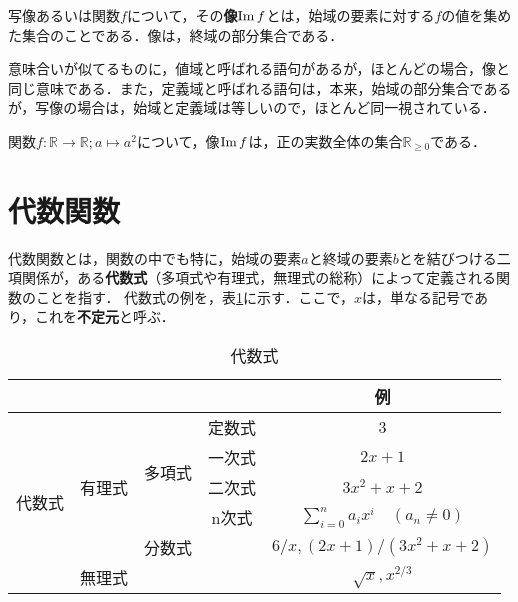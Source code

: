 \begin{definition}[像]
	写像あるいは関数$f$について，その\textbf{像}$\operatorname{Im} f$とは，始域の要素に対する$f$の値を集めた集合のことである．像は，終域の部分集合である．
\end{definition}
\begin{rem*}
	意味合いが似てるものに，値域と呼ばれる語句があるが，ほとんどの場合，像と同じ意味である．また，定義域と呼ばれる語句は，本来，始域の部分集合であるが，写像の場合は，始域と定義域は等しいので，ほとんど同一視されている．
\end{rem*}
\begin{example*}
	関数$f : \mathbb{R} \rightarrow \mathbb{R}; a \mapsto a^2$について，像$\operatorname{Im} f$は，正の実数全体の集合$\mathbb{R}_{\geq 0}$である．
\end{example*}

\newpage
\section{代数関数}
代数関数とは，関数の中でも特に，始域の要素$a$と終域の要素$b$とを結びつける二項関係が，ある\textbf{代数式}（多項式や有理式，無理式の総称）によって定義される関数のことを指す．
代数式の例を，表\ref{table:algebraicExpression}に示す．ここで，$x$は，単なる記号であり，これを\textbf{不定元}と呼ぶ．

\begin{table}[!h]
	\centering
	\caption{代数式}
	\label{table:algebraicExpression}
	\begin{tabular}{cccc|c}
		& & & & 例 \\
		\hline
		\multirow{6}{*}{代数式} & & \multirow{4}{*}{多項式} & 定数式 & $3$ \\
		& & & 一次式 & $2x+1$ \\
		& 有理式& & 二次式 & $3x^2+x+2$ \\
		& & & n次式 & $\sum_{i=0}^{n}a_ix^i\quad(a_n \neq 0)$ \\
		\cline{3-5}
		& & 分数式 & & $6/x, (2x+1)/(3x^2+x+2)$ \\
		\cline{2-5}
		& 無理式 & & & $\sqrt{x}, x^{2/3}$ \\
	\end{tabular}
\end{table}

